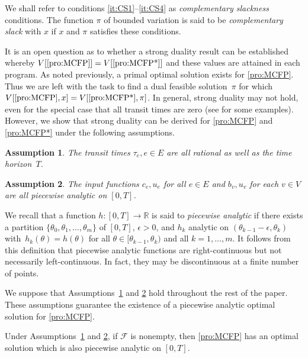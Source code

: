 \documentclass{svjour3}                     \smartqed
\newcommand{\rr}{\ensuremath{\mathbb{R}}}
\newtheorem{asum}{Assumption}
\begin{document}
We shall refer to conditions \ref{it:CS1}--\ref{it:CS4} as \emph{complementary slackness} conditions.
The function $\pi$ of bounded variation is said to be {\em complementary slack} with $x$ if $x$ and $\pi$ satisfies these conditions.








It is an open question as to whether a strong duality result can be established whereby $V[\eqref{pro:MCFP}]= V[\eqref{pro:MCFP*}]$ and these values are attained in each program. As noted previously, a primal optimal solution exists for \eqref{pro:MCFP}. Thus we are left with the task to find a dual feasible solution~$\pi$ for which $V[\eqref{pro:MCFP},x]=V[\eqref{pro:MCFP*},\pi]$. In general, strong duality may not hold, even for the special case that all transit times are zero (see \cite{Pullan97MMS} for some examples). However, we show that strong duality can be derived for \eqref{pro:MCFP} and \eqref{pro:MCFP*} under the following assumptions.

\begin{asum}
\label{asum:rational}
The transit times $\tau_e, e\in E$ are all rational as well as the time horizon~$T$.
\end{asum}

\begin{asum}
\label{asum:analytic}
The input functions $c_e,u_e$ for all $e\in E$ and $b_v, u_v$ for each $v\in V$ are all piecewise
analytic on $[0,T]$.
\end{asum}

We recall that a function $h:[0,T]\rightarrow \rr$ is said to \emph{piecewise analytic} if there exists a partition $\{\theta_0,\theta_1,\ldots,\theta_m\}$ of $[0,T]$, $\epsilon>0$, and $h_k$ analytic on $(\theta_{k-1}-\epsilon,\theta_k)$ with~$h_k(\theta)=h(\theta)$ for all $\theta\in [\theta_{k-1},\theta_k)$ and all $k=1,\ldots,m$. It follows from this definition that piecewise analytic functions are right-continuous but not necessarily left-continuous. In fact, they may be discontinuous at a finite number of points.

We suppose that Assumptions~\ref{asum:rational} and \ref{asum:analytic} hold throughout the rest of the paper. These assumptions guarantee the existence of a piecewise analytic optimal solution for \eqref{pro:MCFP}.

\begin{theorem} 
\label{thm:analytic-flow}
Under Assumptions~\ref{asum:rational} and \ref{asum:analytic}, if $\mathcal{F}$ is nonempty, then \eqref{pro:MCFP} has an optimal solution which is also piecewise analytic on $[0,T]$.
\end{theorem}
\end{document}
